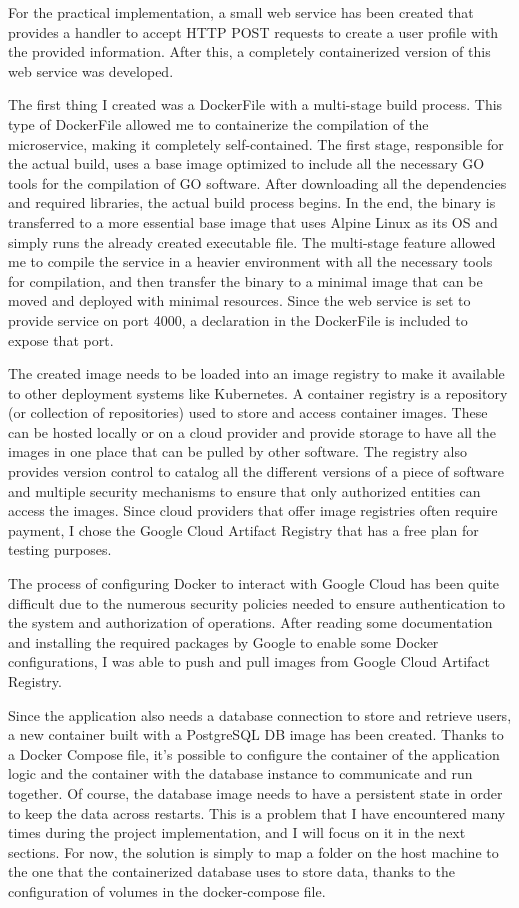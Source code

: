 \documentclass[manuscript,screen,review]{acmart}
\begin{document}
For the practical implementation, a small web service has been created that provides a handler to accept HTTP POST requests to create a user profile with the provided information. After this, a completely containerized version of this web service was developed.

The first thing I created was a DockerFile with a multi-stage build process. This type of DockerFile allowed me to containerize the compilation of the microservice, making it completely self-contained. The first stage, responsible for the actual build, uses a base image optimized to include all the necessary GO tools for the compilation of GO software. After downloading all the dependencies and required libraries, the actual build process begins. In the end, the binary is transferred to a more essential base image that uses Alpine Linux as its OS and simply runs the already created executable file. The multi-stage feature allowed me to compile the service in a heavier environment with all the necessary tools for compilation, and then transfer the binary to a minimal image that can be moved and deployed with minimal resources. Since the web service is set to provide service on port 4000, a declaration in the DockerFile is included to expose that port.

The created image needs to be loaded into an image registry to make it available to other deployment systems like Kubernetes. A container registry is a repository (or collection of repositories) used to store and access container images. These can be hosted locally or on a cloud provider and provide storage to have all the images in one place that can be pulled by other software. The registry also provides version control to catalog all the different versions of a piece of software and multiple security mechanisms to ensure that only authorized entities can access the images. Since cloud providers that offer image registries often require payment, I chose the Google Cloud Artifact Registry that has a free plan for testing purposes.

The process of configuring Docker to interact with Google Cloud has been quite difficult due to the numerous security policies needed to ensure authentication to the system and authorization of operations. After reading some documentation and installing the required packages by Google to enable some Docker configurations, I was able to push and pull images from Google Cloud Artifact Registry.

Since the application also needs a database connection to store and retrieve users, a new container built with a PostgreSQL DB image has been created. Thanks to a Docker Compose file, it's possible to configure the container of the application logic and the container with the database instance to communicate and run together. Of course, the database image needs to have a persistent state in order to keep the data across restarts. This is a problem that I have encountered many times during the project implementation, and I will focus on it in the next sections. For now, the solution is simply to map a folder on the host machine to the one that the containerized database uses to store data, thanks to the configuration of volumes in the docker-compose file.
\end{document}
